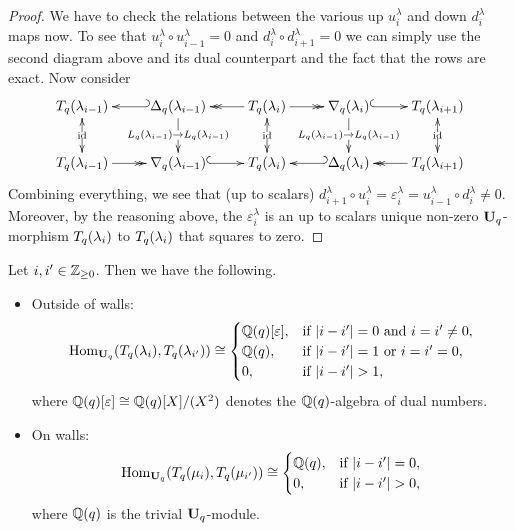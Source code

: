 \begin{proof}
We have to check the relations between the 
various up $u_i^{\lambda}$ and down $d_i^{\lambda}$ maps 
now. To see that $u^{\lambda}_{i}\circ u^{\lambda}_{i-1}=0$ 
and $d^{\lambda}_i\circ d^{\lambda}_{i+1}=0$ we can simply 
use the second diagram above and its dual 
counterpart and the fact that the rows are exact. Now consider
\[
\xymatrix{
\Tn{\lambda_{i-1}}\ar@{<->}[d]|{\mathrm{id}} & \Vn{\lambda_{i-1}}\ar@{_{(}->}[l]\ar[d]|{\Ln{\lambda_{i-1}}\to\Ln{\lambda_{i-1}}} & \Tn{\lambda_{i}}\ar@{<->}[d]|{\mathrm{id}}\ar@{->>}[r]\ar@{->>}[l] & \dVn{\lambda_{i}}\ar@{^{(}->}[r]\ar[d]|{\Ln{\lambda_{i-1}}\to\Ln{\lambda_{i-1}}} & \Tn{\lambda_{i+1}}\ar@{<->}[d]|{\mathrm{id}}\\
\Tn{\lambda_{i-1}}\ar@{->>}[r] & \dVn{\lambda_{i-1}}\ar@{^{(}->}[r] & \Tn{\lambda_{i}} & \Vn{\lambda_{i}}\ar@{_{(}->}[l] & \Tn{\lambda_{i+1}}\ar@{->>}[l].
}
\]
Combining everything, we see that 
(up to scalars) $d^{\lambda}_{i+1}\circ u^{\lambda}_i=\varepsilon_i^{\lambda}=u^{\lambda}_{i-1}\circ d^{\lambda}_{i}\neq 0$. Moreover, by 
the reasoning above, the $\varepsilon_i^{\lambda}$ 
is an up to scalars unique non-zero 
$\boldsymbol{\mathrm{U}}_q$-morphism $T_q({\lambda_i})$ to $T_q({\lambda_i})$ that squares to zero.
\end{proof}

\newpage

\begin{cor}\label{cor-homspaces}
Let $i,i^{\prime}\in\mathbb{Z}_{\geq 0}$. Then we have the following.
\begin{itemize}
\item[(a)] Outside of walls:
\[
\Hom_{\Uq}(\Tn{\lambda_i},\Tn{\lambda_{i^{\prime}}})\cong\begin{cases}\bC[\varepsilon],  & \text{if }|i-i^{\prime}|=0\text{ and }i=i^{\prime}\neq 0,\\
  \bC,  & \text{if }|i-i^{\prime}|=1 \text{ or }i=i^{\prime}=0,\\
  0,  & \text{if }|i-i^{\prime}|>1,\end{cases}
\]
where $\mathbb{Q}(q)[\varepsilon]\cong \mathbb{Q}(q)[X]/(X^2)$ denotes the $\mathbb{Q}(q)$-algebra of dual numbers.
\item[(b)] On walls:
\[
\Hom_{\Uq}(\Tn{\mu_i},\Tn{\mu_{i^{\prime}}})\cong\begin{cases}\bC,  & \text{if }|i-i^{\prime}|=0,\\
  0,  & \text{if }|i-i^{\prime}|>0,\end{cases}
\]
where $\mathbb{Q}(q)$ is the trivial $\boldsymbol{\mathrm{U}}_q$-module.\makeqed
\end{itemize}
\end{cor}



